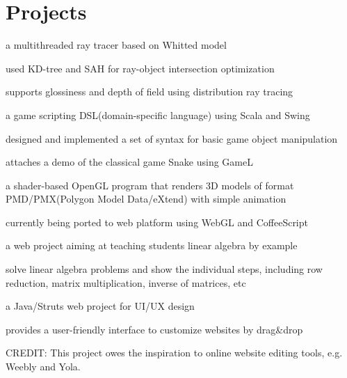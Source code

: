 \documentclass[]{deedy-resume-openfont}
\begin{document}
\begin{minipage}[t]{0.66\textwidth}

\section{Projects}

\begin{tightemize} 
\item a multithreaded ray tracer based on Whitted model
\item used KD-tree and SAH for ray-object intersection optimization
\item supports glossiness and depth of field using distribution ray tracing
\end{tightemize}
\sectionsep

\begin{tightemize} 
\item a game scripting DSL(domain-specific language) using Scala and Swing
\item designed and implemented a set of syntax for basic game object manipulation
\item attaches a demo of the classical game Snake using GameL
\end{tightemize}
\sectionsep

\begin{tightemize} 
\item a shader-based OpenGL program that renders 3D models of format PMD/PMX(Polygon Model Data/eXtend) with simple animation
\item currently being ported to web platform using WebGL and CoffeeScript
\end{tightemize}
\sectionsep

\begin{tightemize} 
\item a web project aiming at teaching students linear algebra by example
\item solve linear algebra problems and show the individual steps,
    including row reduction, matrix multiplication, inverse of matrices, etc
\end{tightemize}
\sectionsep

\begin{tightemize} 
\item a Java/Struts web project for UI/UX design
\item provides a user-friendly interface to customize websites by drag\&drop
\item CREDIT: This project owes the inspiration to online website editing tools, e.g. Weebly and Yola. 
\end{tightemize}
\sectionsep

\end{minipage} 
\end{document}
